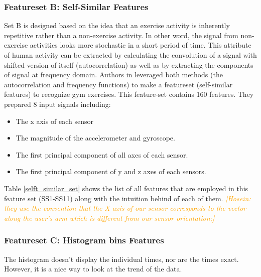 \documentclass[journal,article,submit,moreauthors,pdftex]{Definitions/mdpi}
\newcommand{\hosein}[1]{\textcolor{orange}{{\it [Hosein: #1]}}}
\begin{document}
\subsubsection{Featureset B: Self-Similar Features}
Set B is designed based on the idea that an exercise activity is inherently repetitive rather than a non-exercise activity. In other word, the signal from non-exercise activities looks more stochastic in a short period of time. This attribute of human activity can be extracted by calculating the convolution of a signal with shifted version of itself (autocorrelation) as well as by extracting the components of signal at frequency domain. Authors in \cite{morris2014recofit} leveraged both methods (the autocorrelation and frequency functions) to make a featureset (self-similar features) to recognize gym exercises. This feature-set contains 160 features. They prepared 8 input signals including: 
\begin{itemize}
	\item The x axis of each sensor\\
	\item The magnitude of the accelerometer and gyroscope. \\
	\item The first principal component of all axes of each sensor.\\
	\item The first principal component of y and z axes of each sensors.\\
\end{itemize}
Table \ref{selft_similar_set} shows the list of all features that are employed in this feature set (SS1-SS11) along with the intuition behind of each of them.
\hosein{they use the convention that the X axis of our sensor corresponds to the vector along the user’s arm which is different from our sensor orientation;}
\subsubsection{Featureset C: Histogram bins Features}
The histogram doesn't display the individual times, nor are the times exact. However, it is a nice way to look at the trend of the data.
\end{document}
